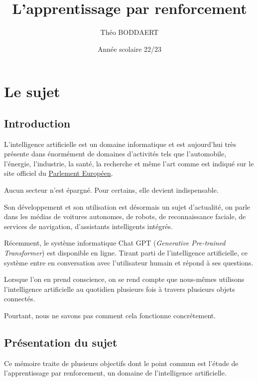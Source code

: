 \documentclass[
12pt,
french,
]{article}
\title{L'apprentissage par renforcement}
\author{Théo BODDAERT}
\date{Année scolaire 22/23}
\begin{document}

{
\setcounter{tocdepth}{3}
\tableofcontents
}

\hypertarget{le-sujet}{%
\section{Le sujet}\label{le-sujet}}

\hypertarget{introduction}{%
\subsection{Introduction}\label{introduction}}

L'intelligence artificielle est un domaine informatique et est
aujourd'hui très présente dans énormément de domaines d'activités tels
que l'automobile, l'énergie, l'industrie, la santé, la recherche et même
l'art comme est indiqué sur le site officiel du
\href{https://www.europarl.europa.eu/news/fr/headlines/society/20200827STO85804/intelligence-artificielle-definition-et-utilisation}{Parlement
Européen}.

Aucun secteur n'est épargné. Pour certains, elle devient indispensable.

Son développement et son utilisation est désormais un sujet d'actualité,
on parle dans les médias de voitures autonomes, de robots, de
reconnaissance faciale, de services de navigation, d'assistants
intelligents intégrés.

Récemment, le système informatique Chat GPT (\emph{Generative
Pre-trained Transformer}) est disponible en ligne. Tirant parti de
l'intelligence artificielle, ce système entre en conversation avec
l'utilisateur humain et répond à ses questions.

Lorsque l'on en prend conscience, on se rend compte que nous-mêmes
utilisons l'intelligence artificielle au quotidien plusieurs fois à
travers plusieurs objets connectés.

Pourtant, nous ne savons pas comment cela fonctionne concrétement.

\hypertarget{pruxe9sentation-du-sujet}{%
\subsection{Présentation du sujet}\label{pruxe9sentation-du-sujet}}

Ce mémoire traite de plusieurs objectifs dont le point commun est
l'étude de l'apprentissage par renforcement, un domaine de
l'intelligence artificielle.
\end{document}
